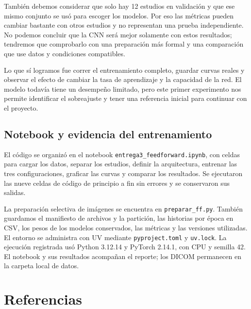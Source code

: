 \documentclass[eng]{ajceam-class}
\begin{document}
También debemos considerar que solo hay 12 estudios en validación y que ese mismo conjunto se usó para escoger los modelos. Por eso las métricas pueden cambiar bastante con otros estudios y no representan una prueba independiente. No podemos concluir que la CNN será mejor solamente con estos resultados; tendremos que comprobarlo con una preparación más formal y una comparación que use datos y condiciones compatibles.

Lo que sí logramos fue correr el entrenamiento completo, guardar curvas reales y observar el efecto de cambiar la tasa de aprendizaje y la capacidad de la red. El modelo todavía tiene un desempeño limitado, pero este primer experimento nos permite identificar el sobreajuste y tener una referencia inicial para continuar con el proyecto.

\subsection{Notebook y evidencia del entrenamiento}

El código se organizó en el notebook \texttt{entrega3\_feedforward.ipynb}, con celdas para cargar los datos, separar los estudios, definir la arquitectura, entrenar las tres configuraciones, graficar las curvas y comparar los resultados. Se ejecutaron las nueve celdas de código de principio a fin sin errores y se conservaron sus salidas.

La preparación selectiva de imágenes se encuentra en \texttt{preparar\_ff.py}. También guardamos el manifiesto de archivos y la partición, las historias por época en CSV, los pesos de los modelos conservados, las métricas y las versiones utilizadas. El entorno se administra con UV mediante \texttt{pyproject.toml} y \texttt{uv.lock}. La ejecución registrada usó Python 3.12.14 y PyTorch 2.14.1, con CPU y semilla 42. El notebook y sus resultados acompañan el reporte; los DICOM permanecen en la carpeta local de datos.


\newpage

\clearpage
\section{Referencias}
\begingroup
\def\section*#1{}
\endgroup






\end{document}
